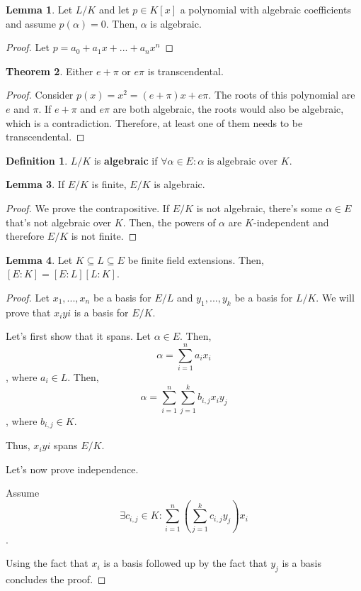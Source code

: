 \documentclass{article}
\theoremstyle{definition}
\newtheorem{definition}{Definition}
\newtheorem{theorem}{Theorem}[section]
\newtheorem{lemma}[theorem]{Lemma}
\begin{document}
\begin{lemma}
    Let $L/K$ and let $p \in K[x]$ a polynomial with algebraic coefficients
    and assume $p(\alpha) = 0$. Then, $\alpha$ is algebraic. 
\end{lemma}
\begin{proof}
    Let $p = a_{0} + a_{1}x + ... + a_{n}x^{n}$
\end{proof}

\begin{theorem}
    Either $e + \pi$ or $e \pi$ is transcendental.
\end{theorem}
\begin{proof}
    Consider $p(x) = x^{2} = (e + \pi)x + e \pi$. The roots of this polynomial
    are $e$ and $\pi$. If $e + \pi$ and $e \pi$ are both algebraic, the roots
    would also be algebraic, which is a contradiction. Therefore, at
    least one of them needs to be transcendental.
\end{proof}

\begin{definition}
    $L/K$ is \textbf{algebraic} if $\forall \alpha \in E: \alpha \text{ is algebraic over $K$}$.
\end{definition}

\begin{lemma}
    If $E/K$ is finite, $E/K$ is algebraic.
\end{lemma}
\begin{proof}
    We prove the contrapositive. If $E/K$ is not algebraic, there's some $\alpha \in E$
    that's not algebraic over $K$. Then, the powers of $\alpha$ are $K$-independent
    and therefore $E/K$ is not finite. 
\end{proof}

\begin{lemma}
    Let $K \subseteq L \subseteq E$ be finite field extensions. Then, $[E : K] = [E : L][L : K]$.
\end{lemma}
\begin{proof}
    Let $x_{1},...,x_{n}$ be a basis for $E/L$ and $y_{1},...,y_{k}$ be a basis for $L/K$.
    We will prove that $x_{i}y{i}$ is a basis for $E/K$.

    Let's first show that it spans. Let $\alpha \in E$. Then, \[ \alpha = \sum_{i = 1}^{n} a_{i}x_{i}\],
    where $a_{i} \in L$. Then, \[ \alpha = \sum_{i = 1}^{n} \sum_{j = 1}^{k} b_{i,j} x_{i} y_{j}\], where $b_{i,j} \in K$.

    Thus, $x_{i}y{i}$ spans $E/K$.

    Let's now prove independence.

    Assume \[\exists c_{i,j} \in K: \sum_{i = 1}^{n} (\sum_{j = 1}^{k} c_{i,j} y_{j}) x_{i}\].

    Using the fact that $x_{i}$ is a basis followed up by the fact that $y_{j}$ is a basis
    concludes the proof.
\end{proof}
\end{document}

